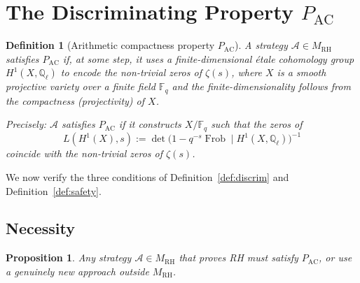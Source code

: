 \documentclass[12pt]{article}
\newtheorem{proposition}[theorem]{Proposition}
\newtheorem{definition}[theorem]{Definition}
\DeclareMathOperator{\Frob}{Frob}
\newcommand{\FF}{\mathbb{F}}
\newcommand{\Ql}{\mathbb{Q}_\ell}
\newcommand{\MRH}{M_{\mathrm{RH}}}
\newcommand{\PAC}{P_{\mathrm{AC}}}
\begin{document}
\section{The Discriminating Property \texorpdfstring{$\PAC$}{P\_AC}}
\label{sec:pac}

\begin{definition}[Arithmetic compactness property $\PAC$]
\label{def:pac}
A strategy $\mathcal{A} \in \MRH$ satisfies $\PAC$ if, at some step,
it uses a finite-dimensional \'etale cohomology group $H^1(X, \Ql)$
to encode the non-trivial zeros of $\zeta(s)$, where $X$ is a smooth
projective variety over a finite field $\FF_q$ and the
finite-dimensionality follows from the compactness (projectivity) of $X$.

Precisely: $\mathcal{A}$ satisfies $\PAC$ if it constructs $X/\FF_q$
such that the zeros of
\[
L(H^1(X), s) := \det\!\bigl(1 - q^{-s}\Frob \mid H^1(X,\Ql)\bigr)^{-1}
\]
coincide with the non-trivial zeros of $\zeta(s)$.
\end{definition}

We now verify the three conditions of Definition~\ref{def:discrim}
and Definition~\ref{def:safety}.

\subsection{Necessity}

\begin{proposition}
\label{prop:necessity}
Any strategy $\mathcal{A} \in \MRH$ that proves RH must satisfy $\PAC$,
or use a genuinely new approach outside $\MRH$.
\end{proposition}
\end{document}

